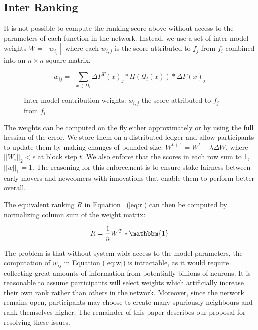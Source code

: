 \documentclass{article}
\begin{document}
\subsection{Inter Ranking}
\label{sec:inter-ranking}
It is not possible to compute the ranking score above without access to the parameters of each function in the network. Instead, we use a set of inter-model weights $W = [w_{i_j}]$ where each $w_{i,j}$ is the score attributed to $f_j$ from $f_i$ combined into an $n \times n$ square matrix.

\begin{equation}
\label{eq:w}
w_{ij} = \ \ \sum_{x \in D_i} \Delta F^T(x)_j * H(\mathcal{Q}_i(x)) * \Delta F(x)_j
\end{equation}

\begin{figure}[H]
	\centering
	\hspace*{-2cm}
	
	\caption{Inter-model contribution weights: $w_{i,j}$ the score attributed to $f_j$ from $f_i$}
\end{figure}{}


The weights can be computed on the fly either approximately \cite{yu2017nisp} or by using the full hessian of the error. We store them on a distributed ledger and allow participants to update them by making changes of bounded size: $W^{t+1}= W^t + \lambda \Delta W$, where $||W_i||_2 < \epsilon$ at block step $t$. We also enforce that the scores in each row sum to 1, $||w||_1 = 1$. {\color{blue} The reasoning for this enforcement is to ensure stake fairness between early movers and newcomers with innovations that enable them to perform better overall.}

The equivalent ranking $R$ in Equation ~(\ref{eq:r}) can then be computed by normalizing column sum of the weight matrix:

\begin{equation}
\label{eq:equiv_ranking}
R = \frac{1}{n} W^T * \mathbbm{1}
\end{equation}

The problem is that without system-wide access to the model parameters, the computation of $w_{ij}$ in Equation (\ref{eq:w}) is intractable, {\color{blue} as it would require collecting great amounts of information from potentially billions of neurons}. It is reasonable to assume participants will select weights which artificially increase their own rank rather than others in the network. Moreover, since the network remains open, participants may choose to create many spuriously neighbours and rank themselves higher. The remainder of this paper describes our proposal for resolving these issues.
\end{document}
